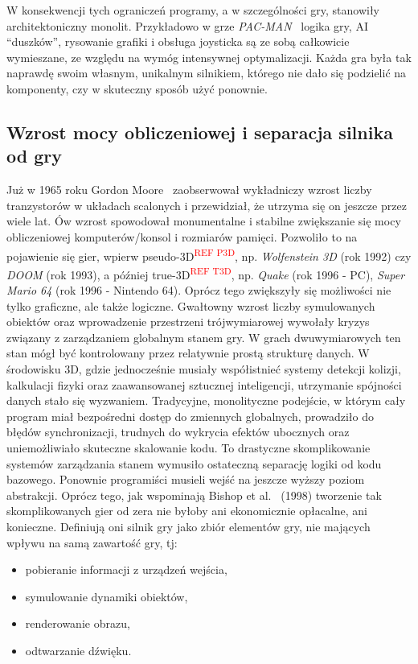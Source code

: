 \documentclass[
    bindingoffset=5mm,
    footnoteindent=3mm,
    hyphenation=true
]{src/wut-thesis}
\newcommand{\refneeded}[1]{\textsuperscript{\textcolor{red}{#1}}}
\begin{document}
W konsekwencji tych ograniczeń programy, a w szczególności gry, stanowiły
architektoniczny monolit. Przykładowo w grze \emph{PAC-MAN}~\cite{PACMAN} logika gry, AI
“duszków”, rysowanie grafiki i obsługa joysticka są ze sobą całkowicie wymieszane, ze
względu na wymóg intensywnej optymalizacji. Każda gra była tak naprawdę swoim
własnym, unikalnym silnikiem, którego nie dało się podzielić na komponenty, czy w
skuteczny sposób użyć ponownie.

\subsection{Wzrost mocy obliczeniowej i separacja silnika od gry}

Już w 1965 roku Gordon Moore~\cite{MOORE} zaobserwował wykładniczy wzrost liczby
tranzystorów w układach scalonych i przewidział, że utrzyma się on jeszcze przez
wiele lat. Ów wzrost spowodował monumentalne i stabilne zwiększanie się mocy
obliczeniowej komputerów/konsol i rozmiarów pamięci. Pozwoliło to na pojawienie się
gier, wpierw pseudo-3D\refneeded{REF P3D}, np. \emph{Wolfenstein 3D} (rok 1992) czy \emph{DOOM} (rok 1993), a
później true-3D\refneeded{REF T3D}, np. \emph{Quake} (rok 1996 - PC), \emph{Super Mario 64} (rok 1996 - Nintendo
64). Oprócz tego zwiększyły się możliwości nie tylko graficzne, ale także logiczne.
Gwałtowny wzrost liczby symulowanych obiektów oraz wprowadzenie przestrzeni
trójwymiarowej wywołały kryzys związany z zarządzaniem globalnym stanem gry. W
grach dwuwymiarowych ten stan mógł być kontrolowany przez relatywnie prostą
strukturę danych. W środowisku 3D, gdzie jednocześnie musiały współistnieć systemy
detekcji kolizji, kalkulacji fizyki oraz zaawansowanej sztucznej inteligencji, utrzymanie
spójności danych stało się wyzwaniem. Tradycyjne, monolityczne podejście, w którym
cały program miał bezpośredni dostęp do zmiennych globalnych, prowadziło do błędów
synchronizacji, trudnych do wykrycia efektów ubocznych oraz uniemożliwiało
skuteczne skalowanie kodu. To drastyczne skomplikowanie systemów zarządzania
stanem wymusiło ostateczną separację logiki od kodu bazowego. Ponownie
programiści musieli wejść na jeszcze wyższy poziom abstrakcji. Oprócz tego, jak
wspominają Bishop et al.~\cite{BISHOP} (1998) tworzenie tak skomplikowanych gier od zera
nie byłoby ani ekonomicznie opłacalne, ani konieczne. Definiują oni silnik gry jako zbiór
elementów gry, nie mających wpływu na samą zawartość gry, tj:
\begin{itemize}
    \item pobieranie informacji z urządzeń wejścia,
    \item symulowanie dynamiki obiektów,
    \item renderowanie obrazu,
    \item odtwarzanie dźwięku.
\end{itemize}
\end{document}

